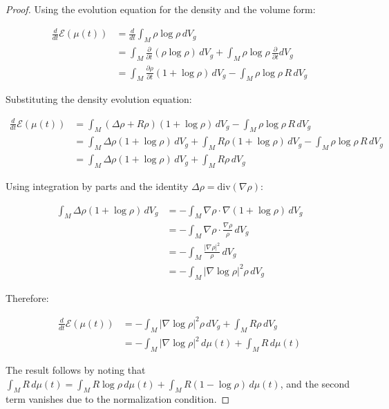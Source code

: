 \documentclass[12pt,a4paper]{article}
\begin{document}
\begin{proof}
Using the evolution equation for the density and the volume form:

\begin{align}
\frac{d}{dt}\mathcal{E}(\mu(t)) &= \frac{d}{dt}\int_M \rho \log \rho \, dV_g \\
&= \int_M \frac{\partial}{\partial t}(\rho \log \rho) \, dV_g + \int_M \rho \log \rho \, \frac{\partial}{\partial t}dV_g \\
&= \int_M \frac{\partial \rho}{\partial t}(1 + \log \rho) \, dV_g - \int_M \rho \log \rho \, R \, dV_g
\end{align}

Substituting the density evolution equation:

\begin{align}
\frac{d}{dt}\mathcal{E}(\mu(t)) &= \int_M (\Delta \rho + R\rho)(1 + \log \rho) \, dV_g - \int_M \rho \log \rho \, R \, dV_g \\
&= \int_M \Delta \rho (1 + \log \rho) \, dV_g + \int_M R\rho(1 + \log \rho) \, dV_g - \int_M \rho \log \rho \, R \, dV_g \\
&= \int_M \Delta \rho (1 + \log \rho) \, dV_g + \int_M R\rho \, dV_g
\end{align}

Using integration by parts and the identity $\Delta \rho = \text{div}(\nabla \rho)$:

\begin{align}
\int_M \Delta \rho (1 + \log \rho) \, dV_g &= -\int_M \nabla \rho \cdot \nabla(1 + \log \rho) \, dV_g \\
&= -\int_M \nabla \rho \cdot \frac{\nabla \rho}{\rho} \, dV_g \\
&= -\int_M \frac{|\nabla \rho|^2}{\rho} \, dV_g \\
&= -\int_M |\nabla \log \rho|^2 \rho \, dV_g
\end{align}

Therefore:

\begin{align}
\frac{d}{dt}\mathcal{E}(\mu(t)) &= -\int_M |\nabla \log \rho|^2 \rho \, dV_g + \int_M R\rho \, dV_g \\
&= -\int_M |\nabla \log \rho|^2 \, d\mu(t) + \int_M R \, d\mu(t)
\end{align}

The result follows by noting that $\int_M R \, d\mu(t) = \int_M R \log \rho \, d\mu(t) + \int_M R(1 - \log \rho) \, d\mu(t)$, and the second term vanishes due to the normalization condition.
\end{proof}
\end{document}
